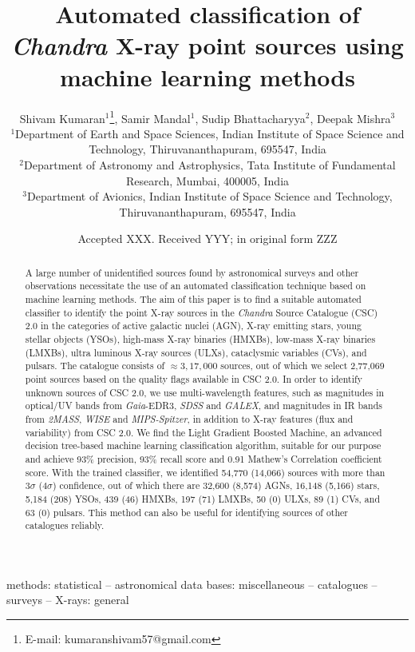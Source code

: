 \documentclass[fleqn,usenatbib]{mnras}
\title[Chandra source classification using ML]{Automated classification of {\em Chandra} X-ray point sources using machine learning methods}
\author[Kumaran et al.]{
Shivam Kumaran$^{1}$\thanks{E-mail: kumaranshivam57@gmail.com},
Samir Mandal$^{1}$,
Sudip Bhattacharyya$^{2}$,
Deepak Mishra$^{3}$
\\
$^{1}$Department of Earth and Space Sciences, Indian Institute of Space Science and Technology, Thiruvananthapuram, 695547, India\\
$^{2}$Department of Astronomy and Astrophysics, Tata Institute of Fundamental Research, Mumbai, 400005, India\\
$^{3}$Department of Avionics, Indian Institute of Space Science and Technology, Thiruvananthapuram, 695547, India
}
\date{Accepted XXX. Received YYY; in original form ZZZ}
\begin{document}
\label{firstpage}
\pagerange{\pageref{firstpage}--\pageref{lastpage}}
\maketitle

\begin{abstract}
A large number of unidentified sources found by astronomical surveys and other observations necessitate the use of an automated classification technique based on machine learning methods. The aim of this paper is to find a suitable automated classifier to identify the point X-ray sources in the {\em Chandra} Source Catalogue (CSC) 2.0 in the categories of active galactic nuclei (AGN), X-ray emitting stars, young stellar objects (YSOs), high-mass X-ray binaries (HMXBs), low-mass X-ray binaries (LMXBs), ultra luminous X-ray sources (ULXs), cataclysmic variables (CVs), and pulsars. The catalogue consists of $\approx 3,17,000$ sources, out of which we select 2,77,069 point sources based on the quality flags available in CSC 2.0. In order to identify unknown sources of CSC 2.0, we use multi-wavelength features, such as magnitudes in optical/UV bands from {\em Gaia}-EDR3, {\em SDSS} and {\em GALEX}, and magnitudes in IR bands from {\em 2MASS}, {\em WISE} and {\em MIPS-Spitzer}, in addition to X-ray features (flux and variability) from CSC 2.0. We find the Light Gradient Boosted Machine, an advanced decision tree-based machine learning classification algorithm, suitable for our purpose and achieve 93\% precision, 93\% recall score and 0.91 Mathew’s Correlation coefficient score. With the trained classifier, we identified 54,770 (14,066) sources with more than $3\sigma$ ($4\sigma$) confidence, out of which there are 32,600 (8,574) AGNs, 16,148 (5,166) stars, 5,184 (208) YSOs, 439 (46) HMXBs, 197 (71) LMXBs, 50 (0) ULXs,  89 (1) CVs,  and 63 (0) pulsars. This method can also be useful for identifying sources of other catalogues reliably.

\end{abstract}


\begin{keywords}
methods: statistical -- astronomical data bases: miscellaneous -- catalogues -- surveys -- X-rays: general
\end{keywords}


\end{document}
